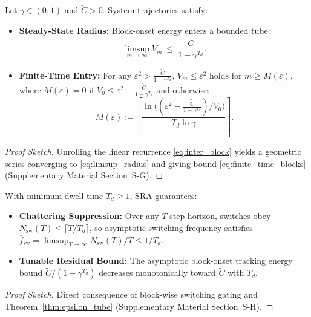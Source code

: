 \documentclass{ccjnl}
\newcommand{\rev}[1]{{\color{blue}#1}}
\def\rev#1{#1}%
\begin{document}
\begin{theorem}
\label{thm:epsilon_tube}
Let $\gamma \in (0,1)$ and $\tilde C > 0$. System trajectories satisfy:
\begin{itemize}
    \item[\textit{(a)}] \textbf{Steady-State Radius:} Block-onset energy enters a bounded tube:
    \begin{equation}\label{eq:limsup_radius}
    \limsup_{m\to\infty}V_m\ \le\ \frac{\tilde C}{1-\gamma^{T_d}}.
    \end{equation}
    \item[\textit{(b)}] \textbf{Finite-Time Entry:} For any $\varepsilon^2 > \frac{\tilde C}{1-\gamma^{T_d}}$, $V_m \le \varepsilon^2$ holds for $m \ge M(\varepsilon)$, where $M(\varepsilon)=0$ if $V_0 \le \varepsilon^2 - \frac{\tilde C}{1-\gamma^{T_d}}$ and otherwise:
    \begin{equation}\label{eq:finite_time_blocks}
    \rev{M(\varepsilon) := \left\lceil \frac{\ln\!\big((\varepsilon^2 - \frac{\tilde C}{1-\gamma^{T_d}})/V_0\big)}{T_d \ln \gamma} \right\rceil.}
    \end{equation}
\end{itemize}
\end{theorem}
\begin{proof}[Proof Sketch]
Unrolling the linear recurrence \eqref{eq:inter_block} yields a geometric series converging to \eqref{eq:limsup_radius} and giving bound \eqref{eq:finite_time_blocks} (Supplementary Material Section~S-G).
\end{proof}

\begin{theorem}
\label{thm:practical_stability}
With minimum dwell time $T_d \ge 1$, SRA guarantees:
\begin{itemize}
    \item[\textit{(a)}] \textbf{Chattering Suppression:} \rev{Over any $T$-step horizon, switches obey $N_{\text{sw}}(T) \le \lceil T/T_d \rceil$, so asymptotic switching frequency satisfies $\bar{f}_{\text{sw}} = \limsup_{T\to\infty} N_{\text{sw}}(T)/T \le 1/T_d$.}
    \item[\textit{(b)}] \textbf{Tunable Residual Bound:} \rev{The asymptotic block-onset tracking energy bound $\tilde{C}/(1-\gamma^{T_d})$ decreases monotonically toward $\tilde{C}$ with $T_d$.}
\end{itemize}
\end{theorem}
\begin{proof}[Proof Sketch]
Direct consequence of block-wise switching gating and Theorem~\ref{thm:epsilon_tube} (Supplementary Material Section~S-H).
\end{proof}
\end{document}
